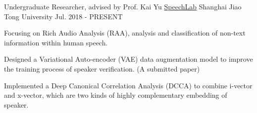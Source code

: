 \begin{cventries}
	\cventry
	{Undergraduate Researcher, advised by Prof. Kai Yu}
	{\href{https://speechlab.sjtu.edu.cn/}{SpeechLab}}
	{Shanghai Jiao Tong University}
	{Jul. 2018 - PRESENT}
	{
		\begin{cvitems}
			\item {Focusing on Rich Audio Analysis (RAA), analysis and classification of non-text information within human speech.}
            \item {Designed a Variational Auto-encoder (VAE) data augmentation model to improve the training process of speaker verification. (A submitted paper)}
            \item {Implemented a Deep Canonical Correlation Analysis (DCCA) to combine i-vector and x-vector, which are two kinds of highly complementary embedding of speaker.}
		\end{cvitems}
	}
\end{cventries}
